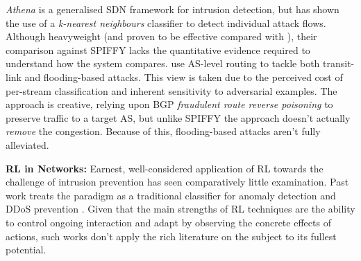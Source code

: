 \documentclass[10pt, times, comsoc]{IEEEtran}
\newcommand{\fakepara}[1]{\noindent\textbf{#1:}}
\begin{document}
\emph{Athena} \cite{DBLP:conf/dsn/LeeKSPY17} is a generalised SDN framework for intrusion detection, but has shown the use of a \emph{k-nearest neighbours} classifier to detect individual attack flows.
Although heavyweight (and proven to be effective compared with \textcite{DBLP:conf/lcn/BragaMP10}), their comparison against SPIFFY lacks the quantitative evidence required to understand how the system compares.
\Textcite{DBLP:conf/sp/SmithS18} use AS-level routing to tackle both transit-link and flooding-based attacks.
This view is taken due to the perceived cost of per-stream classification and inherent sensitivity to adversarial examples.
The approach is creative, relying upon BGP \emph{fraudulent route reverse poisoning} to preserve traffic to a target AS, but unlike SPIFFY the approach doesn't actually \emph{remove} the congestion.
Because of this, flooding-based attacks aren't fully alleviated.

\fakepara{RL in Networks}
Earnest, well-considered application of RL towards the challenge of intrusion prevention has seen comparatively little examination.
Past work treats the paradigm as a traditional classifier for anomaly detection \cite{shamshirband2014anomaly} and DDoS prevention \cite{DBLP:conf/mates/ServinK08}.
Given that the main strengths of RL techniques are the ability to control ongoing interaction and adapt by observing the concrete effects of actions, such works don't apply the rich literature on the subject to its fullest potential.
\end{document}
